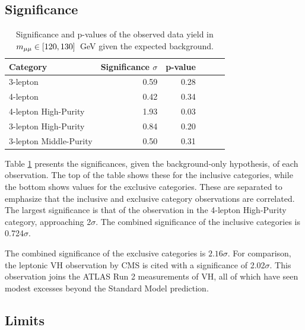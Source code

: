 \subsection{Significance}

\begin{table}[htp]
\caption{Significance and p-values of the observed data yield in $m_{\mu\mu}\in[120,130]$~GeV given the expected background.}
\begin{center}
\begin{tabular}{l r r r r r}\toprule
Category & Significance $\sigma$ & p-value \\
\midrule
3-lepton & 0.59 & 0.28 \\
4-lepton & 0.42 & 0.34 \\
\midrule
4-lepton High-Purity & 1.93 & 0.03 \\
3-lepton High-Purity & 0.84 & 0.20 \\
3-lepton Middle-Purity & 0.50 & 0.31 \\
\bottomrule\end{tabular} %
\label{tab:hmmSignificance}
\end{center}
\end{table}

Table \ref{tab:hmmSignificance} presents the significances, given the background-only hypothesis, of each observation.
The top of the table shows these for the inclusive categories, while the bottom shows values for the exclusive categories.
These are separated to emphasize that the inclusive and exclusive category observations are correlated.
The largest significance is that of the observation in the 4-lepton High-Purity category, approaching 2$\sigma$.
The combined significance of the inclusive categories is 0.724$\sigma$.

The combined significance of the exclusive categories is $2.16\sigma$.
For comparison, the leptonic VH observation by CMS is cited with a significance of 2.02$\sigma$. \cite{cmsHmm}
This observation joins the ATLAS Run 2 measurements of VH, all of which have seen modest excesses beyond the Standard Model prediction. \cite{atlasHComb}

\subsection{Limits}

